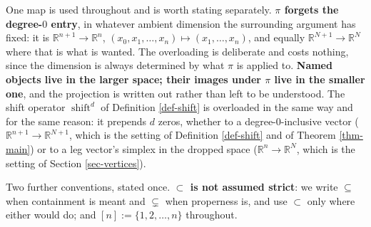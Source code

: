 \documentclass[11pt, a4paper, abstract=yes]{scrartcl}
\theoremstyle{definition}
\theoremstyle{remark}
\theoremstyle{plain}
\newcommand{\shift}{\operatorname{shift}}
\newcommand{\proj}{\pi}
\begin{document}
One map is used throughout and is worth stating separately. \textbf{\textbf{\(\proj\) forgets the
degree-\(0\) entry}}, in whatever ambient dimension the surrounding argument has fixed: it is
\(\mathbb R^{n+1}\to\mathbb R^{n}\), \((x_0,x_1,\dots,x_n)\mapsto(x_1,\dots,x_n)\), and equally
\(\mathbb R^{N+1}\to\mathbb R^{N}\) where that is what is wanted. The overloading is deliberate
and costs nothing, since the dimension is always determined by what \(\proj\) is applied to.
\textbf{\textbf{Named objects live in the larger space; their images under \(\proj\) live in the smaller one}},
and the projection is written out rather than left to be understood. The shift operator
\(\shift^{d}\) of Definition \ref{def-shift} is overloaded in the same way and for the same reason: it
prepends \(d\) zeros, whether to a degree-\(0\)-inclusive vector (\(\mathbb R^{n+1}\to\mathbb
R^{N+1}\), which is the setting of Definition \ref{def-shift} and of Theorem \ref{thm-main}) or to a leg
vector's simplex in the dropped space (\(\mathbb R^{n}\to\mathbb R^{N}\), which is the setting of
Section \ref{sec-vertices}).

Two further conventions, stated once. \textbf{\textbf{\(\subset\) is not assumed strict}}: we write \(\subseteq\)
when containment is meant and \(\subsetneq\) when properness is, and use \(\subset\) only
where either would do; and \([n]:=\lbrace1,2,\dots,n\rbrace\) throughout.
\end{document}
